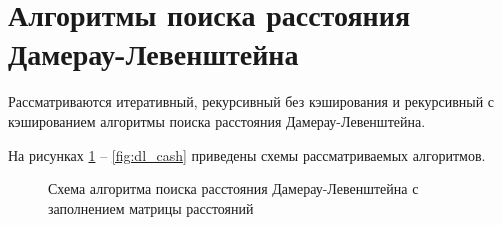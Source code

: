 \section{Алгоритмы поиска расстояния Дамерау-Левенштейна}

Рассматриваются итеративный, рекурсивный без кэширования и рекурсивный с кэшированием алгоритмы поиска расстояния Дамерау-Левенштейна.

На рисунках \ref{fig:dl_iter} --  \ref{fig:dl_cash} приведены схемы рассматриваемых алгоритмов.

\begin{figure}[h!]

		
	\caption{Схема алгоритма поиска расстояния Дамерау-Левенштейна с заполнением матрицы расстояний}
		
	\label{fig:dl_iter}
\end{figure}


